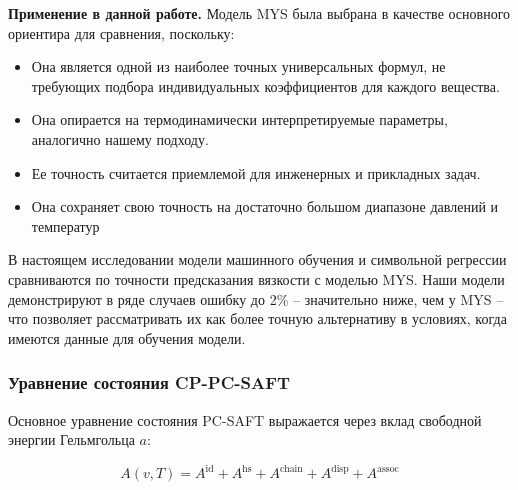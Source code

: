 \documentclass[a4paper,12pt]{article}
\begin{document}
      \textbf{Применение в данной работе.}  
      Модель MYS была выбрана в качестве основного ориентира для сравнения, поскольку:
      \begin{itemize}
        \item Она является одной из наиболее точных универсальных формул, не требующих подбора индивидуальных коэффициентов для каждого вещества.
        \item Она опирается на термодинамически интерпретируемые параметры, аналогично нашему подходу.
        \item Ее точность считается приемлемой для инженерных и прикладных задач.
        \item Она сохраняет свою точность на достаточно большом диапазоне давлений и температур
      \end{itemize}
      
      В настоящем исследовании модели машинного обучения и символьной регрессии сравниваются по точности предсказания вязкости с моделью MYS. Наши модели демонстрируют в ряде случаев ошибку до 2\% -- значительно ниже, чем у MYS -- что позволяет рассматривать их как более точную альтернативу в условиях, когда имеются данные для обучения модели.
      
    \subsubsection{Уравнение состояния CP-PC-SAFT}
    
    Основное уравнение состояния PC-SAFT выражается через вклад свободной энергии Гельмгольца \( a \):
    
    \begin{equation}
    A(v, T) = A^{\text{id}} + A^{\text{hs}} + A^{\text{chain}} + A^{\text{disp}} + A^{\text{assoc}}
    \end{equation}
    
\end{document}
